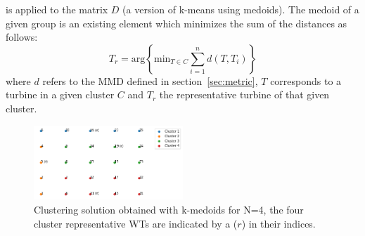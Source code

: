 is applied to the matrix $D$ (a version of k-means using medoids). 
The medoid of a given group is an existing element which minimizes the sum of the distances as follows:
\begin{equation}
\label{EQ:medoid}
T_r = \mathrm{arg} \left\{ \mathrm{min}_{T \in C} \sum_{i=1}^n d(T,T_i) \right\}
\end{equation}
where $d$ refers to the MMD defined in section~\ref{sec:metric}, $T$ corresponds to a turbine in a given cluster $C$ and $T_r$ the representative turbine of that given cluster.


\begin{figure}[!h]
\centering
\includegraphics[width=0.5\textwidth]{part2/figures/WAKE/sol_kmedoids4.png}
\caption{Clustering solution obtained with k-medoids for N=4, the four cluster representative WTs are indicated by a ($r$) in their indices.}
\label{fig:kmedoids4}
\end{figure}



